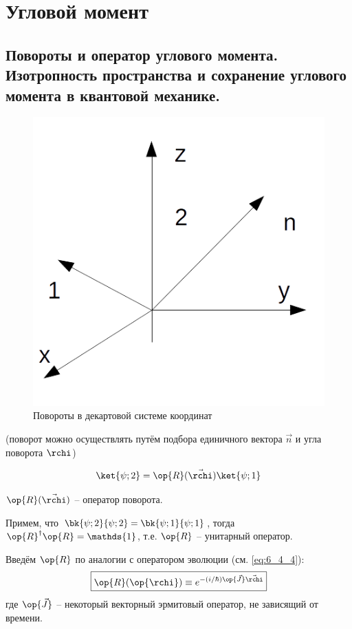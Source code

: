\chapter{Угловой момент}

\section{Повороты и оператор углового момента. Изотропность пространства и сохранение углового момента в квантовой механике.}

\begin{figure}[h]
  \centering
  \includegraphics[scale=0.6]{figs/8_1}
  \caption{Повороты в декартовой системе координат}
  \label{fig:8_1}
\end{figure}

(поворот можно осуществлять путём подбора единичного вектора $\vec{n}$ и угла поворота $\rchi$)

$$
\ket{\psi;2} = \op{R}(\vec{\rchi}) \ket{\psi;1}
$$

$\op{R}(\vec{\rchi})$ -- оператор поворота.

Примем, что $\bk{\psi;2}{\psi;2} = \bk{\psi;1}{\psi;1}$, тогда $\op{R}^\dag \op{R} = \mathds{1}$, т.е. $\op{R}$ -- унитарный оператор.

Введём $\op{R}$ по аналогии с оператором эволюции (см. \eqref{eq:6_4_4}):
\begin{equation}
\label{eq:8_1_1}
\boxed {
	\op{R}(\op{\rchi}) \equiv e^{-(i/\hbar) \op{\vec{J}} \vec{\rchi}}
}
\end{equation}
где $\op{\vec{J}}$ -- некоторый векторный эрмитовый оператор, не зависящий от времени.

